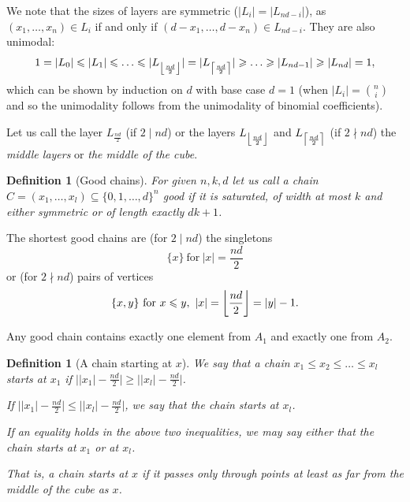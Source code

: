 \documentclass[11pt, reqno]{amsart}
\newcommand{\leanblueprintbase}{https://mj141592.github.io/weighted-chains-paper}
\newif\ifleanlinks
\newcommand{\leanblueprint}[1]{%
  \ifleanlinks
    \leavevmode\unskip\penalty9999\hbox{}\nobreak\hfill\quad
    \href{\leanblueprintbase/theorems/#1/}{%
      \mbox{\normalfont\footnotesize\textcolor{blue}{[\textsf{Lean formalisation}]}}}%
    \par\nobreak
  \fi
}
\newtheorem{definition}[theorem]{Definition}
\theoremstyle{remark}
\numberwithin{equation}{section}
\newcommand{\thehypercube}{\{0, 1, \ldots, d\}^n}
\newcommand{\fclass}{\mathchoice
  {\left\lfloor \frac{nd}{2} \right\rfloor}
  {\big\lfloor \frac{nd}{2} \big\rfloor}
  {\big\lfloor \frac{nd}{2} \big\rfloor}
  {\big\lfloor \frac{nd}{2} \big\rfloor}}
\newcommand{\cclass}{\mathchoice
  {\left\lceil \frac{nd}{2} \right\rceil}
  {\big\lceil \frac{nd}{2} \big\rceil}
  {\big\lceil \frac{nd}{2} \big\rceil}
  {\big\lceil \frac{nd}{2} \big\rceil}}
\begin{document}
We note that the sizes of layers are symmetric ($\vert L_i \vert = \vert L_{nd-i} \vert$), as $(x_1, \dots, x_n) \in L_i$ if and only if $(d-x_1, \dots, d-x_n) \in L_{nd-i}$. They are also unimodal:
\begin{equation*}
    1=\vert L_0\vert  \leqslant \vert L_1\vert  \leqslant \ldots \leqslant \vert L_{\fclass}\vert =\vert L_{\cclass}\vert  \geqslant \ldots \geqslant \vert L_{nd-1}\vert  \geqslant \vert L_{nd}\vert =1,
\end{equation*}
which can be shown by induction on $d$ with base case $d=1$ (when $\vert L_i\vert=\binom{n}{i}$ and so the unimodality follows from the unimodality of binomial coefficients).

Let us call the layer $L_{\frac{nd}{2}}$ (if $2 \mid nd$) or the layers $L_{\fclass}$ and $L_{\cclass}$ (if $2 \nmid nd$) the \emph{middle layers} or \emph{the middle of the cube}.

\begin{definition}[Good chains]
\label{wc:def:good-chain}
\label{good_chain_definition}
    For given $n, k, d$ let us call a chain $C=(x_1, \ldots, x_l) \subseteq \thehypercube$ \emph{good} if it is saturated, of width at most $k$ and either symmetric or of length exactly $dk+1$.
\leanblueprint{good-chain}
\end{definition}

The shortest good chains are (for $2 \mid nd$) the singletons
\begin{equation}
\label{singleton_chains_equation}
    \{x\} \ \text{for} \ \vert x\vert =\frac{nd}{2}
\end{equation}
or (for $2 \nmid nd$) pairs of vertices
\begin{equation}
\label{double_chains_equation}
    \{x, y\} \ \text{for} \ x \leqslant y, \ \vert x\vert =\fclass=\vert y\vert -1.
\end{equation}

Any good chain contains exactly one element from $A_1$ and exactly one from $A_2$.

\begin{definition}[A chain starting at $x$]
\label{wc:def:chain-start}
    We say that a chain $x_1 \leqslant x_2 \leqslant \ldots \leqslant x_l$ starts at $x_1$ if $\big\vert  \vert x_1\vert -\frac{nd}{2} \big\vert  \geqslant \big\vert  \vert x_l\vert -\frac{nd}{2} \big\vert $.

    If $\big\vert  \vert x_1\vert -\frac{nd}{2} \big\vert  \leqslant \big\vert  \vert x_l\vert -\frac{nd}{2} \big\vert $, we say that the chain starts at $x_l$.

    If an equality holds in the above two inequalities, we may say either that the chain starts at $x_1$ or at $x_l$.

    That is, a chain starts at $x$ if it passes only through points at least as far from the middle of the cube as $x$.
\leanblueprint{chain-start}
\end{definition}
\end{document}
